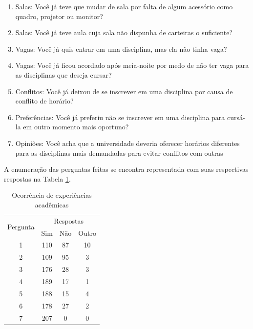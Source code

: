 \begin{enumerate}
  \item Salas: Você já teve que mudar de sala por falta de algum acessório como quadro, projetor ou monitor? %
  \item Salas: Você já teve aula cuja sala não dispunha de carteiras o suficiente? %
  \item Vagas: Você já quis entrar em uma disciplina, mas ela não tinha vaga? %
  \item Vagas: Você já ficou acordado após meia-noite por medo de não ter vaga para as disciplinas que deseja cursar? %
  \item Conflitos: Você já deixou de se inscrever em uma disciplina por causa de conflito de horário? %
  \item Preferências: Você já preferiu não se inscrever em uma disciplina para cursá-la em outro momento mais oportuno? %
  \item Opiniões: Você acha que a universidade deveria oferecer horários diferentes para as disciplinas mais demandadas para evitar conflitos com outras  %
\end{enumerate}

A enumeração das perguntas feitas se encontra representada com suas respectivas respostas na Tabela \ref{table:3.0_satisfacao}.

\begin{table}[htbp]
  \centering
  \caption{\label{table:3.0_satisfacao}Ocorrência de experiências acadêmicas}
  \begin{tabular}{| c | c c c |}
    \hline
    \multicolumn{1}{|c|}{\multirow{2}{*}{Pergunta}} & \multicolumn{3}{c|}{Respostas}
    \\
    \multicolumn{1}{|c|}{}                          &
    Sim                                             &
    \multicolumn{1}{|c|}{Não}                       &
    Outro
    \\
    \hline
    1                                               & 110                            & 87 & 10 \\ %
    2                                               & 109                            & 95 & 3  \\ %
    3                                               & 176                            & 28 & 3  \\ %
    4                                               & 189                            & 17 & 1  \\ %
    5                                               & 188                            & 15 & 4  \\ %
    6                                               & 178                            & 27 & 2  \\ %
    7                                               & 207                            & 0  & 0  \\ %
    \hline
  \end{tabular}
\end{table}

